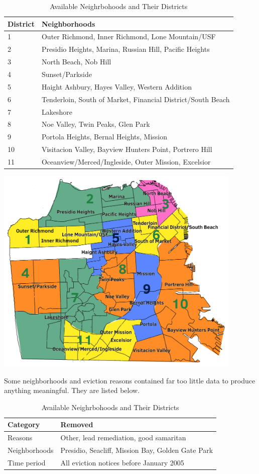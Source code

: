 \documentclass[]{article}
\begin{document}
\begin{table}[!h]
\begin{tabular}{l | l}
District & Neighborhoods \\
\hline
1 		 & Outer Richmond, Inner Richmond, Lone Mountain/USF \\
2		 & Presidio Heights, Marina, Russian Hill, Pacific Heights \\
3 		 & North Beach, Nob Hill \\
4		 & Sunset/Parkside \\
5		 & Haight Ashbury, Hayes Valley, Western Addition \\
6		 & Tenderloin, South of Market, Financial District/South Beach \\
7		 & Lakeshore \\
8 		 & Noe Valley, Twin Peaks, Glen Park \\
9		 & Portola Heights, Bernal Heights, Mission \\
10 		 & Visitacion Valley, Bayview Hunters Point, Portrero Hill \\
11		 & Oceanview/Merced/Ingleside, Outer Mission, Excelsior \\
\end{tabular}
\caption{Available Neighrbohoods and Their Districts}
\end{table}

\includegraphics[height=10cm]{legitmap}

Some neighborhoods and eviction reasons contained far too little data to produce anything meaningful. They are listed below.

\begin{table}[!h]
\begin{tabular}{l | l}
Category & Removed \\\hline
Reasons  & Other, lead remediation, good samaritan \\
Neighborhoods & Presidio, Seacliff, Mission Bay, Golden Gate Park \\
Time period & All eviction notices before January 2005 \\
\end{tabular}
\caption{Available Neighrbohoods and Their Districts}
\end{table}
\end{document}

